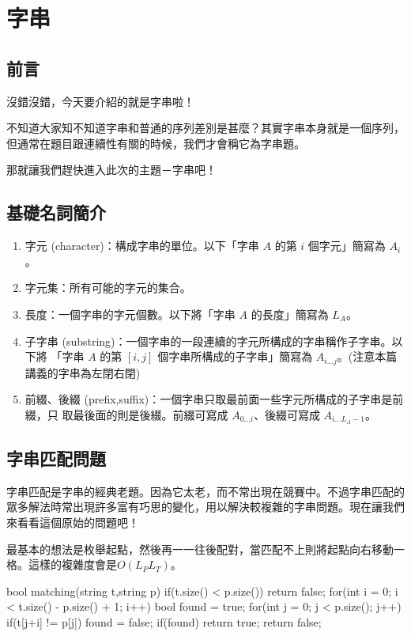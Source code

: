 \chapter{字串\uppercase\expandafter{}}

\section{前言}
沒錯沒錯，今天要介紹的就是字串啦！

不知道大家知不知道字串和普通的序列差別是甚麼？其實字串本身就是一個序列，但通常在題目跟連續性有關的時候，我們才會稱它為字串題。

那就讓我們趕快進入此次的主題－字串吧！
\section{基礎名詞簡介}
\begin{enumerate}
\item 字元 (character)：構成字串的單位。以下「字串 $A$ 的第 $i$ 個字元」簡寫為 $A_i$。
\item 字元集：所有可能的字元的集合。
\item 長度：一個字串的字元個數。以下將「字串 $A$ 的長度」簡寫為 $L_A$。
\item 子字串 (substring)：一個字串的一段連續的字元所構成的字串稱作子字串。以下將
「字串 $A$ 的第 $[i, j]$ 個字串所構成的子字串」簡寫為 $A_{i...j}$。(注意本篇講義的字串為左閉右閉)
\item 前綴、後綴 (prefix,suffix)：一個字串只取最前面一些字元所構成的子字串是前綴，只
取最後面的則是後綴。前綴可寫成 $A_{0...i}$、後綴可寫成 $A_{i...L_A-1}$。
\end{enumerate}

\section{字串匹配問題}
字串匹配是字串的經典老題。因為它太老，而不常出現在競賽中。不過字串匹配的眾多解法時常出現許多富有巧思的變化，用以解決較複雜的字串問題。現在讓我們來看看這個原始的問題吧！\\


最基本的想法是枚舉起點，然後再一一往後配對，當匹配不上則將起點向右移動一格。這樣的複雜度會是$O(L_P L_T)$。\\

\begin{C++}
bool matching(string t,string p){
    if(t.size() < p.size()) return false;
    for(int i = 0; i < t.size() - p.size() + 1; i++){
        bool found = true;
        for(int j = 0; j < p.size(); j++)
            if(t[j+i] != p[j]) found = false;
        if(found) return true;
    }
    return false;
}
\end{C++}

